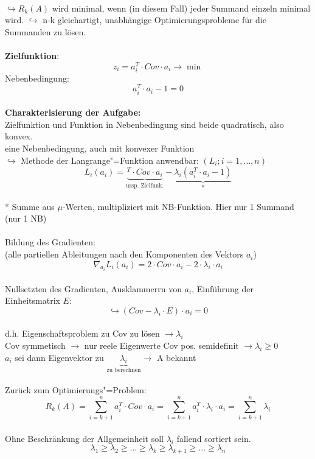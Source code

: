\documentclass[a4paper,12pt]{scrreprt}
\newcommand{\Nb}[1]{\textbf{#1}}
\begin{document}
\\
$ \hookrightarrow R_k(A)$ wird minimal, wenn (in diesem Fall) jeder Summand einzeln minimal wird.
$\hookrightarrow$ n-k gleichartigt, unabhängige Optimierungsprobleme für die Summanden zu lösen.\\
\\
\Nb{Zielfunktion}:\\
$$z_i=a_i^T \cdot Cov\cdot a_i \to \min$$
Nebenbedingung:
$$a_i^T\cdot a_i -1 = 0$$
\\
\Nb{Charakterisierung der Aufgabe:}\\
Zielfunktion und Funktion in Nebenbedingung sind beide quadratisch, also konvex.\\
eine Nebenbedingung, auch mit konvexer Funktion\\
$\hookrightarrow$ Methode der Langrange"=Funktion anwendbar: $(L_i; i=1,\dots,n)$\\
$$L_i(a_i)=\underbrace{^T\cdot Cov \cdot a_i}_{\text{ursp. Zielfunk.}} - \underbrace{\lambda_i(a_i^T\cdot a_i-1)}_{*}$$\\
* Summe aus $\mu$-Werten, multipliziert mit NB-Funktion. Hier nur 1 Summand (nur 1 NB)\\
\\
Bildung des Gradienten:\\
(alle partiellen Ableitungen nach den Komponenten des Vektors $a_i$)\\
$$ \nabla_{a_i} L_i(a_i)=2\cdot Cov\cdot a_i-2\cdot\lambda_i\cdot a_i$$\\
Nullsetzten des Gradienten, Ausklammerrn von $a_i$, Einführung der Einheitsmatrix $E$:\\
$$\hookrightarrow (Cov-\lambda_i\cdot E)\cdot a_i =0$$\\
d.h. Eigenschaftsproblem zu Cov zu lösen $\rightarrow \lambda_i$\\
Cov symmetisch $\rightarrow$ nur reele Eigenwerte
Cov pos. semidefinit $\rightarrow \lambda_i \geq 0$\\
$a_i$ sei dann Eigenvektor zu $ \underbrace{\lambda_i}_{\text{zu berechnen}} \rightarrow$ A bekannt \\
\\
Zurück zum Optimierungs"=Problem: \\
$$R_k(A) = \sum_{i=k+1}^n a_i^T \cdot Cov \cdot a_i = \sum_{i=k+1}^n a_i^T \cdot \lambda_i \cdot a_i = \sum_{i=k+1}^n \lambda_i $$\\
Ohne Beschränkung der Allgemeinheit soll $\lambda_i$ fallend sortiert sein.\\
$$\lambda_1 \geq \lambda_2 \geq \dots \geq \lambda_k \geq \lambda_{k+1} \geq \dots \geq \lambda_n$$
\end{document}
